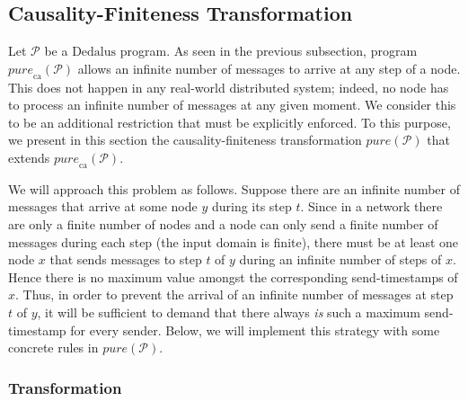 \documentclass{tlp}
\newcommand{\langname}[1]{\text{#1}}  \newcommand{\pred}[1]{\mathtt{#1}}  \newcommand{\fname}[1]{\mathit{#1}}  \newcommand{\sq}[1]{`{#1}'}
\newcommand{\dedalus}{\langname{Dedalus}}
\newcommand{\ded}{\mathcal{P}}
\newcommand{\var}[1]{\mathtt{#1}}
\newcommand{\tvar}[1]{\mathtt{\bar{#1}}}
\newcommand{\chosen}{\pred{chosen}}
\newcommand{\rcvinf}{\pred{rcvInf}}
\newcommand{\issmaller}{\pred{isSmaller}}
\newcommand{\hasmax}{\pred{hasMax}}
\newcommand{\hassender}{\pred{hasSender}}
\newcommand{\purecaus}[1]{\fname{pure}_{\mathrm{ca}}(#1)}
\newcommand{\pure}[1]{\fname{pure}(#1)}
\begin{document}
\subsection{Causality-Finiteness Transformation}

\label{sub:causal-finite-transformation}

Let $\ded$ be a $\dedalus$ program. As seen in the previous subsection,
program $\purecaus{\ded}$ allows an infinite number of messages to
arrive at any step of a node. This does not happen in any real-world
distributed system; indeed, no node has to process an infinite number
of messages at any given moment. We consider this to be an additional
restriction that must be explicitly enforced. To this purpose, we
present in this section the causality-finiteness transformation $\pure{\ded}$
that extends $\purecaus{\ded}$.



We will approach this problem as follows. Suppose there are an infinite
number of messages that arrive at some node $y$ during its step $t$.
Since in a network there are only a finite number of nodes and a node
can only send a finite number of messages during each step (the input
domain is finite), there must be at least one node $x$ that sends
messages to step $t$ of $y$ during an infinite number of steps of
$x$. Hence there is no maximum value amongst the corresponding send-timestamps
of $x$. Thus, in order to prevent the arrival of an infinite number
of messages at step $t$ of $y$, it will be sufficient to demand
that there always \emph{is} such a maximum send-timestamp for every
sender. Below, we will implement this strategy with some concrete
rules in $\pure{\ded}$.


\subsubsection{Transformation}

\newcommand{\rulehassender}[1]{\hassender(\var y,\var t,\var x,\var s)\gets\chosen_{R}(\var x,\var s,\var y,\var t,\tvar w),\,\neg\rcvinf(\var y,\var t)#1}


\newcommand{\ruleissmaller}[1]{\begin{array}{ll}\issmaller(\var y,\var t,\var x,\var s)\gets  &  \hassender(\var y,\var t,\var x,\var s),\,\hassender(\var y,\var t,\var x,\var{s'}),\\&  \var s<\var{s'}#1 \end{array}}


\newcommand{\rulehasmax}[1]{\hasmax(\var y,\var t,\var x)\gets\hassender(\var y,\var t,\var x,\var s),\,\neg\issmaller(\var y,\var t,\var x,\var s)#1}
\end{document}
